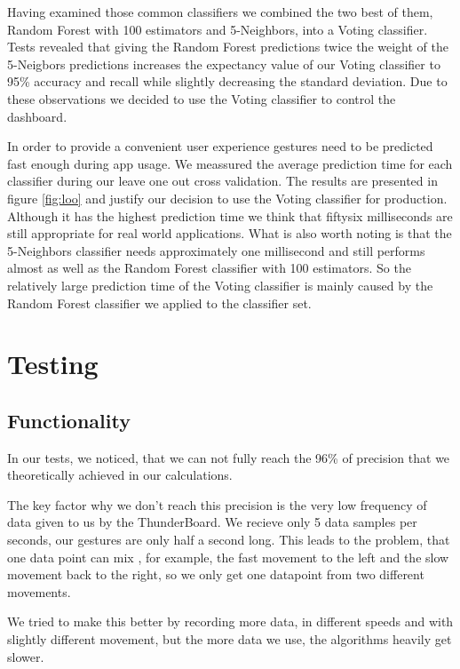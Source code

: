 Having examined those common classifiers we combined the two best of them, Random Forest with 100 estimators and 5-Neighbors, into a Voting classifier. Tests revealed that giving the Random Forest predictions twice the weight of the 5-Neigbors predictions increases the expectancy value of our Voting classifier to 95\% accuracy and recall while slightly decreasing the standard deviation. Due to these observations we decided to use the Voting classifier to control the dashboard.

In order to provide a convenient user experience gestures need to be predicted fast enough during app usage. We meassured the average prediction time for each classifier during our leave one out cross validation. The results are presented in figure \ref{fig:loo} and justify our decision to use the Voting classifier for production. Although it has the highest prediction time we think that fiftysix milliseconds are still appropriate for real world applications. What is also worth noting is that the 5-Neighbors classifier needs approximately one millisecond and still performs almost as well as the Random Forest classifier with 100 estimators. So the relatively large prediction time of the Voting classifier is mainly caused by the Random Forest classifier we applied to the classifier set.


\chapter{Testing}
\label{ch:Tests}

\section{Functionality}
\label{ch:Results:sec:Functionality}

In our tests, we noticed, that we can not fully reach the 96\% of precision that we theoretically achieved in our calculations.

The key factor why we don't reach this precision is the very low frequency of data given to us by the ThunderBoard.
We recieve only 5 data samples per seconds, our gestures are only half a second long.
This leads to the problem, that one data point can mix , for example, the fast movement to the left and the slow movement back to the right, so we only get one datapoint from two different movements.

We tried to make this better by recording more data, in different speeds and with slightly different movement, but the more data we use, the algorithms heavily get slower.

